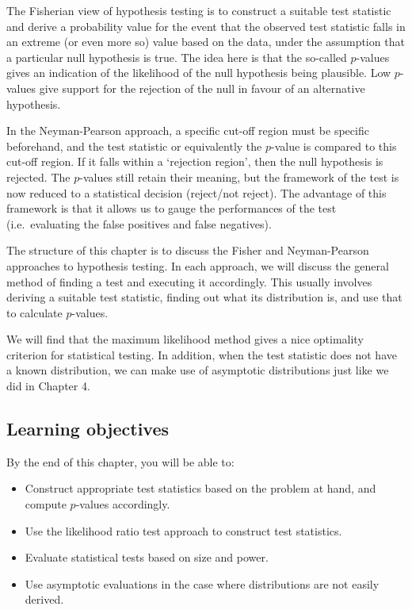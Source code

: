 \documentclass[
]{book}
\providecommand{\tightlist}{%
  \setlength{\itemsep}{0pt}\setlength{\parskip}{0pt}}
\theoremstyle{definition}
\theoremstyle{definition}
\theoremstyle{definition}
\theoremstyle{definition}
\theoremstyle{remark}
\begin{document}
The Fisherian view of hypothesis testing is to construct a suitable test statistic and derive a probability value for the event that the observed test statistic falls in an extreme (or even more so) value based on the data, under the assumption that a particular null hypothesis is true.
The idea here is that the so-called \(p\)-values gives an indication of the likelihood of the null hypothesis being plausible.
Low \(p\)-values give support for the rejection of the null in favour of an alternative hypothesis.

In the Neyman-Pearson approach, a specific cut-off region must be specific beforehand, and the test statistic or equivalently the \(p\)-value is compared to this cut-off region.
If it falls within a `rejection region', then the null hypothesis is rejected.
The \(p\)-values still retain their meaning, but the framework of the test is now reduced to a statistical decision (reject/not reject).
The advantage of this framework is that it allows us to gauge the performances of the test (i.e.~evaluating the false positives and false negatives).

The structure of this chapter is to discuss the Fisher and Neyman-Pearson approaches to hypothesis testing.
In each approach, we will discuss the general method of finding a test and executing it accordingly.
This usually involves deriving a suitable test statistic, finding out what its distribution is, and use that to calculate \(p\)-values.

We will find that the maximum likelihood method gives a nice optimality criterion for statistical testing.
In addition, when the test statistic does not have a known distribution, we can make use of asymptotic distributions just like we did in Chapter 4.

\hypertarget{learning-objectives-4}{%
\subsection*{Learning objectives}\label{learning-objectives-4}}

By the end of this chapter, you will be able to:

\begin{itemize}
\tightlist
\item
  Construct appropriate test statistics based on the problem at hand, and compute \(p\)-values accordingly.
\item
  Use the likelihood ratio test approach to construct test statistics.
\item
  Evaluate statistical tests based on size and power.
\item
  Use asymptotic evaluations in the case where distributions are not easily derived.
\end{itemize}
\end{document}
